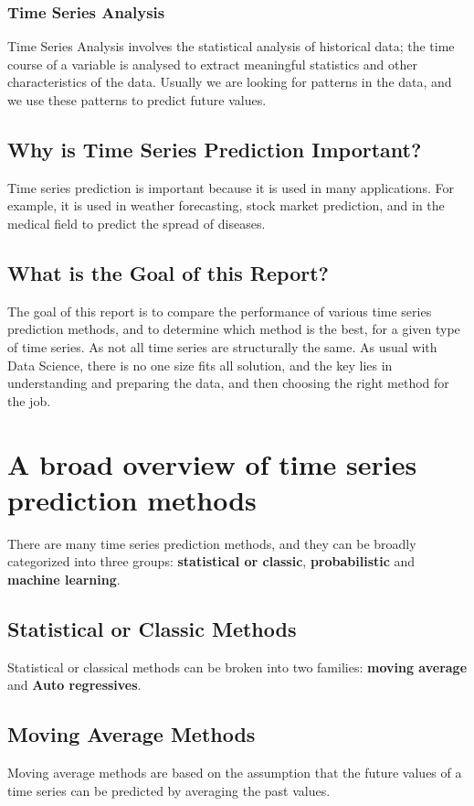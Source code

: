 \documentclass[manuscript,screen,nonacm,11pt]{acmart}                                                          %
\numberwithin{equation}{section}
\begin{document}
\subsubsection{Time Series Analysis}
Time Series Analysis involves the statistical analysis of historical data; the time course of a variable is analysed to extract meaningful statistics and other characteristics of the data.
Usually we are looking for patterns in the data, and we use these patterns to predict future values.


\subsection{Why is Time Series Prediction Important?}
Time series prediction is important because it is used in many applications.
For example, it is used in weather forecasting, stock market prediction, and in the medical field to predict the spread of diseases.
\subsection{What is the Goal of this Report?}
The goal of this report is to compare the performance of various
time series prediction methods, and to determine which method is the best,
for a given type of time series. As not all time series are structurally
the same. As usual with Data Science, there is no one size fits all solution,
and the key lies in understanding and preparing the data, and then
choosing the right method for the job.


\section{A broad overview of time series prediction methods}
\label{sec:overview}
There are many time series prediction methods, and they can be broadly
categorized into three groups: \textbf{statistical or classic}, \textbf{probabilistic} and \textbf{machine learning}.
\subsection{Statistical or Classic Methods}
Statistical or classical methods can be broken into two families: \textbf{moving average} and \textbf{Auto regressives}.




\subsection*{Moving Average Methods}
Moving average methods are based on the assumption that the future values of a time series can be predicted by averaging the past values.
\end{document}
